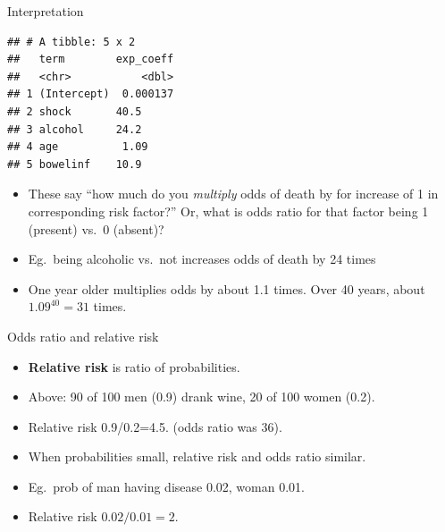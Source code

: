 \documentclass[
  ignorenonframetext,
]{beamer}
\begin{document}
\begin{frame}[fragile]{Interpretation}
\protect\hypertarget{interpretation}{}

\small

\begin{verbatim}
## # A tibble: 5 x 2
##   term        exp_coeff
##   <chr>           <dbl>
## 1 (Intercept)  0.000137
## 2 shock       40.5     
## 3 alcohol     24.2     
## 4 age          1.09    
## 5 bowelinf    10.9
\end{verbatim}

\normalsize

\begin{itemize}
\item
  These say ``how much do you \emph{multiply} odds of death by for
  increase of 1 in corresponding risk factor?'' Or, what is odds ratio
  for that factor being 1 (present) vs.~0 (absent)?
\item
  Eg.~being alcoholic vs.~not increases odds of death by 24 times
\item
  One year older multiplies odds by about 1.1 times. Over 40 years,
  about \(1.09^{40}=31\) times.
\end{itemize}

\end{frame}

\begin{frame}{Odds ratio and relative risk}
\protect\hypertarget{odds-ratio-and-relative-risk}{}

\begin{itemize}
\item
  \textbf{Relative risk} is ratio of probabilities.
\item
  Above: 90 of 100 men (0.9) drank wine, 20 of 100 women (0.2).
\item
  Relative risk 0.9/0.2=4.5. (odds ratio was 36).
\item
  When probabilities small, relative risk and odds ratio similar.
\item
  Eg.~prob of man having disease 0.02, woman 0.01.
\item
  Relative risk \(0.02/0.01=2\).
\end{itemize}

\end{frame}
\end{document}
